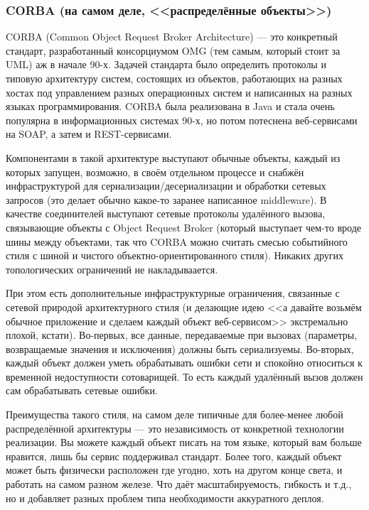 \documentclass[a5paper]{article}
\begin{document}
\subsubsection{CORBA (на самом деле, <<распределённые объекты>>)}

CORBA (Common Object Request Broker Architecture) --- это конкретный стандарт, разработанный консорциумом OMG (тем самым, который стоит за UML) аж в начале 90-х. Задачей стандарта было определить протоколы и типовую архитектуру систем, состоящих из объектов, работающих на разных хостах под управлением разных операционных систем и написанных на разных языках программирования. CORBA была реализована в Java и стала очень популярна в информационных системах 90-х, но потом потеснена веб-сервисами на SOAP, а затем и REST-сервисами.

Компонентами в такой архитектуре выступают обычные объекты, каждый из которых запущен, возможно, в своём отдельном процессе и снабжён инфраструктурой для сериализации/десериализации и обработки сетевых запросов (это делает обычно какое-то заранее написанное middleware). В качестве соединителей выступают сетевые протоколы удалённого вызова, связывающие объекты с Object Request Broker (который выступает чем-то вроде шины между объектами, так что CORBA можно считать смесью событийного стиля с шиной и чистого объектно-ориентированного стиля). Никаких других топологических ограничений не накладываается.

При этом есть дополнительные инфраструктурные ограничения, связанные с сетевой природой архитектурного стиля (и делающие идею <<а давайте возьмём обычное приложение и сделаем каждый объект веб-сервисом>> экстремально плохой, кстати). Во-первых, все данные, передаваемые при вызовах (параметры, возвращаемые значения и исключения) должны быть сериализуемы. Во-вторых, каждый объект должен уметь обрабатывать ошибки сети и спокойно относиться к временной недоступности сотоварищей. То есть каждый удалённый вызов должен сам обрабатывать сетевые ошибки.

Преимущества такого стиля, на самом деле типичные для более-менее любой распределённой архитектуры --- это независимость от конкретной технологии реализации. Вы можете каждый объект писать на том языке, который вам больше нравится, лишь бы сервис поддерживал стандарт. Более того, каждый объект может быть физически расположен где угодно, хоть на другом конце света, и работать на самом разном железе. Что даёт масштабируемость, гибкость и т.д., но и добавляет разных проблем типа необходимости аккуратного деплоя.
\end{document}
